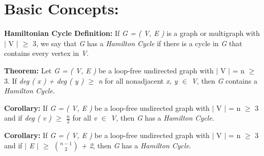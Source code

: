 \section{Basic Concepts:}

{\bfseries Hamiltonian Cycle Definition:} If {\itshape G = ( V, E )} is a graph or multigraph with $\vert$ V $\vert$ $\geq$ 3, we say that {\itshape G} has a {\itshape Hamilton Cycle} if there is a cycle in {\itshape G} that contains every vertex in {\itshape V}. \hfill \break

{\bfseries Theorem:} Let {\itshape G = ( V, E )} be a loop-free undirected graph with $\vert$ V $\vert$ = n $\geq$ 3. If {\itshape deg ( x ) + deg ( y ) $\geq$ n} for all nonadjacent {\itshape x, y $\in$ V}, then {\itshape G} contains a {\itshape Hamilton Cycle}. \hfill \break

{\bfseries Corollary:} If {\itshape G = ( V, E )} be a loop-free undirected graph with $\vert$ V $\vert$ = n $\geq$ 3 and if {\itshape deg ( v ) $\geq$ $\frac{n}{2}$} for all {\itshape v $\in$ V}, then {\itshape G} has a {\itshape Hamilton Cycle}. \hfill \break

{\bfseries Corollary:} If {\itshape G = ( V, E )} be a loop-free undirected graph with $\vert$ V $\vert$ = n $\geq$ 3 and if {\itshape $\vert$ E $\vert$ $\geq$ ${n - 1 \choose 2}$ + 2}, then {\itshape G} has a {\itshape Hamilton Cycle}.

\pagebreak